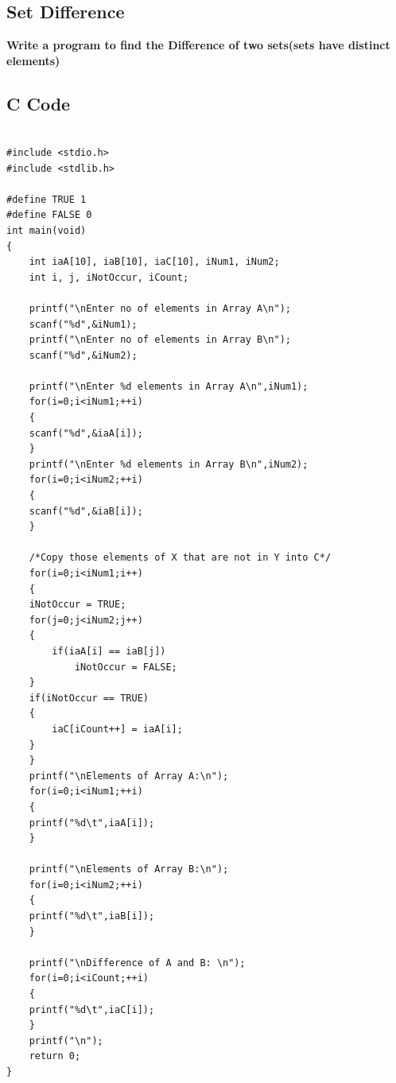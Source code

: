 \documentclass[a4paper]{report}
\begin{document}
\chapter{}
\section{Set Difference}
{\selectfont \textbf{Write a program to find the Difference of two sets(sets have distinct elements)    }}
\section*{C Code}
\begin{Verbatim}

#include <stdio.h>
#include <stdlib.h>

#define TRUE 1
#define FALSE 0
int main(void)
{
    int iaA[10], iaB[10], iaC[10], iNum1, iNum2;
    int i, j, iNotOccur, iCount;

    printf("\nEnter no of elements in Array A\n");
    scanf("%d",&iNum1);
    printf("\nEnter no of elements in Array B\n");
    scanf("%d",&iNum2);

    printf("\nEnter %d elements in Array A\n",iNum1);
    for(i=0;i<iNum1;++i)
    {
	scanf("%d",&iaA[i]);
    }
    printf("\nEnter %d elements in Array B\n",iNum2);
    for(i=0;i<iNum2;++i)
    {
	scanf("%d",&iaB[i]);
    }

	/*Copy those elements of X that are not in Y into C*/
    for(i=0;i<iNum1;i++)
    {
	iNotOccur = TRUE;
	for(j=0;j<iNum2;j++)
	{
	    if(iaA[i] == iaB[j])
	        iNotOccur = FALSE;
	}
	if(iNotOccur == TRUE)
	{
	    iaC[iCount++] = iaA[i];
	}
    }
    printf("\nElements of Array A:\n");
    for(i=0;i<iNum1;++i)
    {
	printf("%d\t",iaA[i]);
    }

    printf("\nElements of Array B:\n");
    for(i=0;i<iNum2;++i)
    {
	printf("%d\t",iaB[i]);
    }

    printf("\nDifference of A and B: \n");
    for(i=0;i<iCount;++i)
    {
	printf("%d\t",iaC[i]);
    }
    printf("\n");
    return 0;
}
\end{Verbatim}
\end{document}
